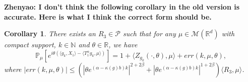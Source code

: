 \documentclass[12pt, a4paper]{amsart}
\newtheorem{cor}[thm]{Corollary}
\theoremstyle{definition}
\numberwithin{equation}{section}
\begin{document}
    {\bf Zhenyao: I don't think the following corollary in the old version is accurate. Here is what I think the correct form should be.}
\begin{cor}
\label{cor: corollary1}
There exists an $R_3 \in \mathcal{P}$ such that for any $\mu\in \mathcal M(\mathbb R^d)$ with compact support, $k \in \mathbb{N}$ and $\theta \in \mathbb{R}$, we have
\[
    \mathbb P_{\mu}[e^{i\theta(\langle g_k, X_1\rangle-\langle T_1^{\alpha}g_k,\mu \rangle)}]
    =1+\langle Z_{g_k}(\cdot,\theta),\mu\rangle+ err(k,\mu,\theta),
\]
    where $|err(k,\mu,\theta)| \leq (|\theta e^{(\alpha-\kappa(g)b)k}|^{2+2\beta} + |\theta e^{(\alpha-\kappa(g)b)k}|^{1+2\beta} )\langle R_3,\mu\rangle$.
\end{cor}
\end{document}
